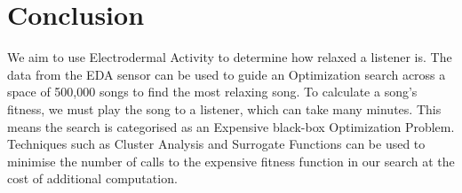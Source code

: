 \documentclass{article}
\begin{document}
	\section{Conclusion}
	We aim to use Electrodermal Activity to determine how relaxed a listener is. The data from the EDA sensor can be used to guide an Optimization search across a space of 500,000 songs to find the most relaxing song. To calculate a song's fitness, we must play the song to a listener, which can take many minutes. This means the search is categorised as an Expensive black-box Optimization Problem. Techniques such as Cluster Analysis and Surrogate Functions can be used to minimise the number of calls to the expensive fitness function in our search at the cost of additional computation.
	
	\newpage
	\begin{footnotesize}
		\begin{multicols}{2}
			
		\end{multicols}
	\end{footnotesize}
	\restoregeometry
	
\end{document}
